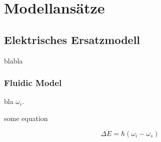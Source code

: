 \chapter{Modellansätze}
\label{sec:modelapproaches}


\section{Elektrisches Ersatzmodell}
\label{sec:electricalmodel}

blabla

\subsection{Fluidic Model}
\label{subsec:fluidicmodel}

bla $\omega_i$. 

some equation

\begin{equation} \label{eq:energyshift}
\Delta E = \hbar (\omega_i - \omega_s)
\end{equation}
